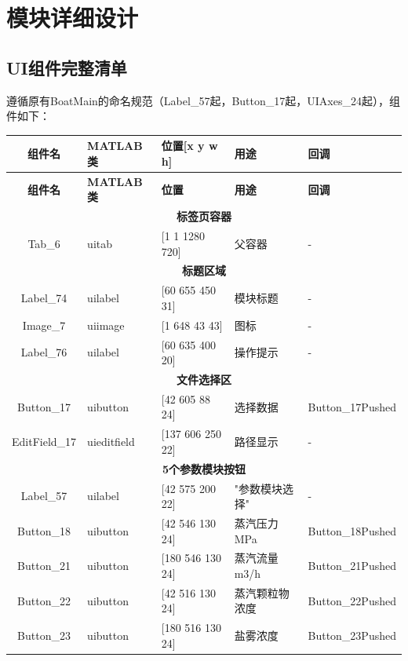 \documentclass[12pt,a3paper]{ctexart}
\begin{document}
\section{模块详细设计}

\subsection{UI组件完整清单}

遵循原有BoatMain的命名规范（Label\_57起，Button\_17起，UIAxes\_24起），组件如下：

\begin{longtable}{c|l|l|l|l}
\toprule
\textbf{组件名} & \textbf{MATLAB类} & \textbf{位置[x y w h]} & \textbf{用途} & \textbf{回调} \\
\midrule
\endfirsthead
\toprule
\textbf{组件名} & \textbf{MATLAB类} & \textbf{位置} & \textbf{用途} & \textbf{回调} \\
\midrule
\endhead
\multicolumn{5}{c}{\textbf{标签页容器}} \\
\hline
Tab\_6 & uitab & [1 1 1280 720] & 父容器 & - \\
\hline
\multicolumn{5}{c}{\textbf{标题区域}} \\
\hline
Label\_74 & uilabel & [60 655 450 31] & 模块标题 & - \\
Image\_7 & uiimage & [1 648 43 43] & 图标 & - \\
Label\_76 & uilabel & [60 635 400 20] & 操作提示 & - \\
\hline
\multicolumn{5}{c}{\textbf{文件选择区}} \\
\hline
Button\_17 & uibutton & [42 605 88 24] & 选择数据 & Button\_17Pushed \\
EditField\_17 & uieditfield & [137 606 250 22] & 路径显示 & - \\
\hline
\multicolumn{5}{c}{\textbf{5个参数模块按钮}} \\
\hline
Label\_57 & uilabel & [42 575 200 22] & "参数模块选择" & - \\
Button\_18 & uibutton & [42 546 130 24] & 蒸汽压力 MPa & Button\_18Pushed \\
Button\_21 & uibutton & [180 546 130 24] & 蒸汽流量 m3/h & Button\_21Pushed \\
Button\_22 & uibutton & [42 516 130 24] & 蒸汽颗粒物浓度 & Button\_22Pushed \\
Button\_23 & uibutton & [180 516 130 24] & 盐雾浓度 & Button\_23Pushed \\

\end{longtable}
\end{document}
